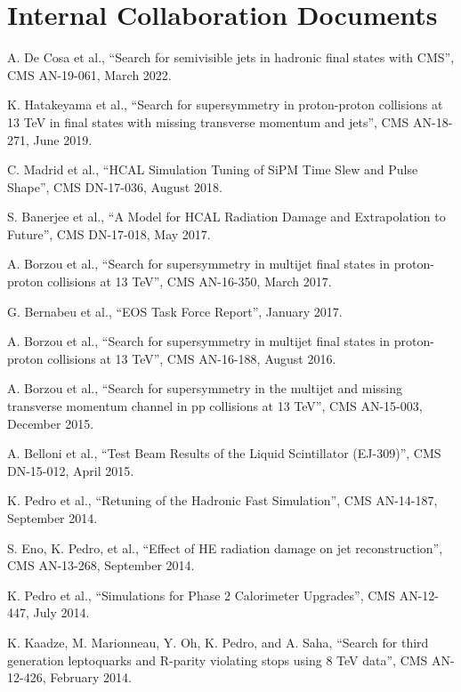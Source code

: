 \section{Internal Collaboration Documents}
\begin{description}[leftmargin=12pt,font=\normalfont,labelsep=0em]
\item A. De Cosa et al., ``Search for semivisible jets in hadronic final states with CMS'', CMS AN-19-061, March 2022.
\item K. Hatakeyama et al., ``Search for supersymmetry in proton-proton collisions at 13 TeV in final states with missing transverse momentum and jets'', CMS AN-18-271, June 2019.
\item C. Madrid et al., ``HCAL Simulation Tuning of SiPM Time Slew and Pulse Shape'', CMS DN-17-036, August 2018.
\item S. Banerjee et al., ``A Model for HCAL Radiation Damage and Extrapolation to Future'', CMS DN-17-018, May 2017.
\item A. Borzou et al., ``Search for supersymmetry in multijet final states in proton-proton collisions at 13 TeV'', CMS AN-16-350, March 2017.
\item G. Bernabeu et al., ``EOS Task Force Report'', January 2017.
\item A. Borzou et al., ``Search for supersymmetry in multijet final states in proton-proton collisions at 13 TeV'', CMS AN-16-188, August 2016.
\item A. Borzou et al., ``Search for supersymmetry in the multijet and missing transverse momentum channel in pp collisions at 13 TeV'', CMS AN-15-003, December 2015.
\item A. Belloni et al., ``Test Beam Results of the Liquid Scintillator (EJ-309)'', CMS DN-15-012, April 2015.
\item K. Pedro et al., ``Retuning of the Hadronic Fast Simulation'', CMS AN-14-187, September 2014.
\item S. Eno, K. Pedro, et al., ``Effect of HE radiation damage on jet reconstruction'', CMS AN-13-268, September 2014.
\item K. Pedro et al., ``Simulations for Phase 2 Calorimeter Upgrades'', CMS AN-12-447, July 2014.
\item K. Kaadze, M. Marionneau, Y. Oh, K. Pedro, and A. Saha, ``Search for third generation leptoquarks and R-parity violating stops using 8 TeV data'', CMS AN-12-426, February 2014.
\end{description}
\fi
